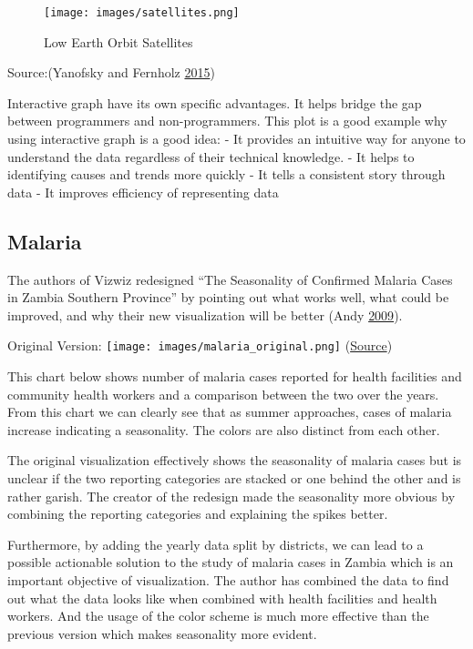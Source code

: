 \documentclass[]{book}
\begin{document}
\begin{figure}
\centering
\texttt{[image: images/satellites.png]}
\caption{Low Earth Orbit Satellites}
\end{figure}

Source:(Yanofsky and Fernholz \protect\hyperlink{ref-Satellite}{2015})

Interactive graph have its own specific advantages. It helps bridge the gap between programmers and non-programmers. This plot is a good example why using interactive graph is a good idea:
- It provides an intuitive way for anyone to understand the data regardless of their technical knowledge.
- It helps to identifying causes and trends more quickly
- It tells a consistent story through data
- It improves efficiency of representing data

\hypertarget{malaria}{%
\subsection{Malaria}\label{malaria}}

The authors of Vizwiz redesigned ``The Seasonality of Confirmed Malaria Cases in Zambia Southern Province'' by pointing out what works well, what could be improved, and why their new visualization will be better (Andy \protect\hyperlink{ref-vizwiz}{2009}).

Original Version: \texttt{[image: images/malaria\_original.png]}
(\href{https://www.path.org/visualize-no-malaria/}{Source})

This chart below shows number of malaria cases reported for health facilities and community health workers and a comparison between the two over the years. From this chart we can clearly see that as summer approaches, cases of malaria increase indicating a seasonality. The colors are also distinct from each other.

The original visualization effectively shows the seasonality of malaria cases but is unclear if the two reporting categories are stacked or one behind the other and is rather garish. The creator of the redesign made the seasonality more obvious by combining the reporting categories and explaining the spikes better.

Furthermore, by adding the yearly data split by districts, we can lead to a possible actionable solution to the study of malaria cases in Zambia which is an important objective of visualization. The author has combined the data to find out what the data looks like when combined with health facilities and health workers. And the usage of the color scheme is much more effective than the previous version which makes seasonality more evident.
\end{document}
